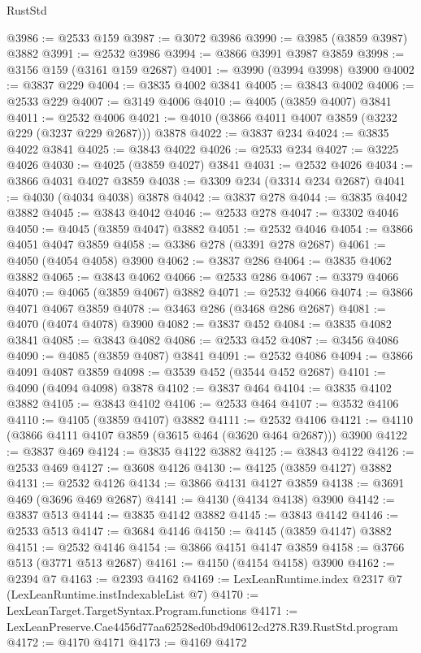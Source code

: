 \begin{lexlean}{RustStd}
\begin{coremodule}
@3986 := @2533 @159
@3987 := @3072 @3986
@3990 := @3985 (@3859 @3987) @3882
@3991 := @2532 @3986
@3994 := @3866 @3991 @3987 @3859
@3998 := @3156 @159 (@3161 @159 @2687)
@4001 := @3990 (@3994 @3998) @3900
@4002 := @3837 @229
@4004 := @3835 @4002 @3841
@4005 := @3843 @4002
@4006 := @2533 @229
@4007 := @3149 @4006
@4010 := @4005 (@3859 @4007) @3841
@4011 := @2532 @4006
@4021 := @4010 (@3866 @4011 @4007 @3859 (@3232 @229 (@3237 @229 @2687))) @3878
@4022 := @3837 @234
@4024 := @3835 @4022 @3841
@4025 := @3843 @4022
@4026 := @2533 @234
@4027 := @3225 @4026
@4030 := @4025 (@3859 @4027) @3841
@4031 := @2532 @4026
@4034 := @3866 @4031 @4027 @3859
@4038 := @3309 @234 (@3314 @234 @2687)
@4041 := @4030 (@4034 @4038) @3878
@4042 := @3837 @278
@4044 := @3835 @4042 @3882
@4045 := @3843 @4042
@4046 := @2533 @278
@4047 := @3302 @4046
@4050 := @4045 (@3859 @4047) @3882
@4051 := @2532 @4046
@4054 := @3866 @4051 @4047 @3859
@4058 := @3386 @278 (@3391 @278 @2687)
@4061 := @4050 (@4054 @4058) @3900
@4062 := @3837 @286
@4064 := @3835 @4062 @3882
@4065 := @3843 @4062
@4066 := @2533 @286
@4067 := @3379 @4066
@4070 := @4065 (@3859 @4067) @3882
@4071 := @2532 @4066
@4074 := @3866 @4071 @4067 @3859
@4078 := @3463 @286 (@3468 @286 @2687)
@4081 := @4070 (@4074 @4078) @3900
@4082 := @3837 @452
@4084 := @3835 @4082 @3841
@4085 := @3843 @4082
@4086 := @2533 @452
@4087 := @3456 @4086
@4090 := @4085 (@3859 @4087) @3841
@4091 := @2532 @4086
@4094 := @3866 @4091 @4087 @3859
@4098 := @3539 @452 (@3544 @452 @2687)
@4101 := @4090 (@4094 @4098) @3878
@4102 := @3837 @464
@4104 := @3835 @4102 @3882
@4105 := @3843 @4102
@4106 := @2533 @464
@4107 := @3532 @4106
@4110 := @4105 (@3859 @4107) @3882
@4111 := @2532 @4106
@4121 := @4110 (@3866 @4111 @4107 @3859 (@3615 @464 (@3620 @464 @2687))) @3900
@4122 := @3837 @469
@4124 := @3835 @4122 @3882
@4125 := @3843 @4122
@4126 := @2533 @469
@4127 := @3608 @4126
@4130 := @4125 (@3859 @4127) @3882
@4131 := @2532 @4126
@4134 := @3866 @4131 @4127 @3859
@4138 := @3691 @469 (@3696 @469 @2687)
@4141 := @4130 (@4134 @4138) @3900
@4142 := @3837 @513
@4144 := @3835 @4142 @3882
@4145 := @3843 @4142
@4146 := @2533 @513
@4147 := @3684 @4146
@4150 := @4145 (@3859 @4147) @3882
@4151 := @2532 @4146
@4154 := @3866 @4151 @4147 @3859
@4158 := @3766 @513 (@3771 @513 @2687)
@4161 := @4150 (@4154 @4158) @3900
@4162 := @2394 @7
@4163 := @2393 @4162
@4169 := LexLeanRuntime.index @2317 @7 (LexLeanRuntime.instIndexableList @7)
@4170 := LexLeanTarget.TargetSyntax.Program.functions
@4171 := LexLeanPreserve.Cae4456d77aa62528ed0bd9d0612cd278.R39.RustStd.program
@4172 := @4170 @4171
@4173 := @4169 @4172

\end{coremodule}
\end{lexlean}
